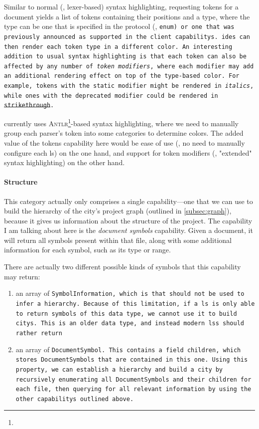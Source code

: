 \documentclass[../thesis]{subfiles}
\begin{document}
\begin{itemize}
	      Similar to normal (\eg, lexer-based) syntax highlighting, requesting \glspl{token} for a document yields a list of tokens containing their positions and a type, where the type can be one that is specified in the protocol (\eg, \tt{enum}) or one that was previously announced as supported in the client \glspl{capability}.
	      \glspl{ide} can then render each token type in a different color.
	      An interesting addition to usual syntax highlighting is that each token can also be affected by any number of \emph{token modifiers}, where each modifier may add an additional rendering effect on top of the type-based color.
	      For example, tokens with the \tt{static} modifier might be rendered in \textit{italics}, while ones with the \tt{deprecated} modifier could be rendered in \st{strikethrough}.

	      \SEE{} currently uses \textsc{Antlr}\footnote{}-based syntax highlighting, where we need to manually group each parser's token into some categories to determine colors.
	      The added value of the \glspl{token} \gls{capability} here would be ease of use (\ie, no need to manually configure each \gls{ls}) on the one hand, and support for token modifiers (\ie, "extended" syntax highlighting) on the other hand.
\end{itemize}


\paragraph{Structure}
This category actually only comprises a single \gls{capability}---one that we can use to build the hierarchy of the \gls{city}'s project graph (outlined in \cref{subsec:graph}), because it gives us information about the structure of the project.
The \gls{capability} I am talking about here is the \emph{document symbols} \gls{capability}.
Given a document, it will return all symbols present within that file, along with some additional information for each symbol, such as its type or \gls{range}.

There are actually two different possible kinds of symbols that this \gls{capability} may return:
\begin{enumerate}
	\item an array of \tt{SymbolInformation}, which is  that should not be used to infer a hierarchy.
	      Because of this limitation, if a \gls{ls} is only able to return symbols of this data type, we cannot use it to build \glspl{city}.
	      This is an older data type, and instead modern \glspl{ls} should rather return
	\item an array of \tt{DocumentSymbol}.
	      This contains a field \tt{children}, which stores \tt{DocumentSymbol}s that are contained in this one.
	      Using this property, we can establish a hierarchy and build a \gls{city} by recursively enumerating all \tt{DocumentSymbol}s and their children for each file, then querying for all relevant information by using the other \glspl{capability} outlined above.
\end{enumerate}
\end{document}
